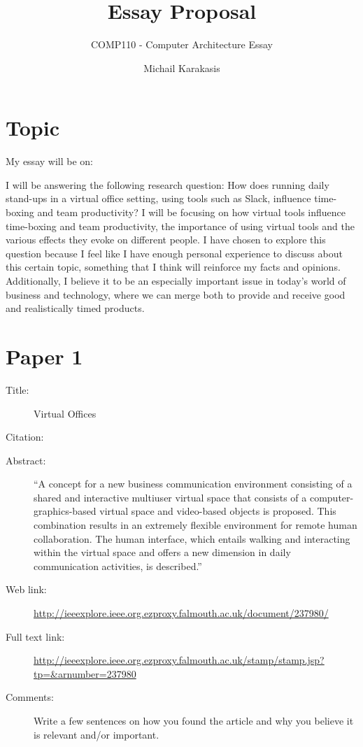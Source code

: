 \documentclass{scrartcl}
\title{Essay Proposal}
\subtitle{COMP110 - Computer Architecture Essay}
\author{Michail Karakasis}
\begin{document}
\maketitle

\section*{Topic}

My essay will be on:

I will be answering the following research question: How does running daily stand-ups in a virtual office setting, using tools such as Slack, influence time-boxing and team productivity? I will be focusing on how virtual tools influence time-boxing and team productivity, the importance of using virtual tools and the various effects they evoke on different people. I have chosen to explore this question because I feel like I have enough personal experience to discuss about this certain topic, something that I think will reinforce my facts and opinions. Additionally, I believe it to be an especially important issue in today's world of business and technology, where we can merge both to provide and receive good and realistically timed products.

\section*{Paper 1}
\begin{description}
\item[Title:] Virtual Offices
\item[Citation:] \cite{shannon}
\item[Abstract:] ``A concept for a new business communication environment consisting of a shared and interactive multiuser virtual space that consists of a computer-graphics-based virtual space and video-based objects is proposed. This combination results in an extremely flexible environment for remote human collaboration. The human interface, which entails walking and interacting within the virtual space and offers a new dimension in daily communication activities, is described.''
\item[Web link:] \url{http://ieeexplore.ieee.org.ezproxy.falmouth.ac.uk/document/237980/}
\item[Full text link:] \url{http://ieeexplore.ieee.org.ezproxy.falmouth.ac.uk/stamp/stamp.jsp?tp=&arnumber=237980}
\item[Comments:] Write a few sentences on how you found the article and why you believe it is relevant and/or important.
\end{description}
\end{document}
